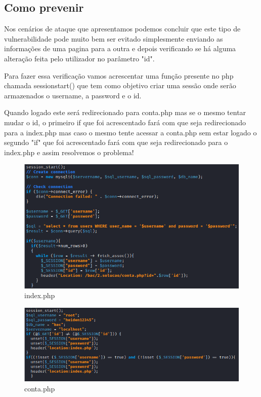 \documentclass{report}
\begin{document}
\clearpage

\subsection{Como prevenir}
Nos cenários de ataque que apresentamos podemos concluir que este tipo de vulnerabilidade pode muito bem ser evitado simplesmente enviando as informações de uma pagina para a outra e depois verificando se há alguma alteração feita pelo utilizador no parâmetro "id". 

Para fazer essa verificação vamos acrescentar uma função presente no php chamada session\textunderscore start() que tem como objetivo criar uma sessão onde serão armazenados o username, a password e o id. 

Quando logado este será redirecionado para conta.php mas se o mesmo tentar mudar o id, o primeiro if que foi acrescentado fará com que seja redirecionado para a index.php mas caso o mesmo tente acessar a conta.php sem estar logado o segundo "if" que foi acrescentado fará com que seja redirecionado para o index.php e assim resolvemos o problema!

\begin{figure}[!htb]
\centering
{}
  \includegraphics[width=\linewidth]{imagescodebac/baccode3.png}
  \caption{index.php}\label{fig:index.php}
\endminipage
\end{figure}
\begin{figure}[!htb]
\centering
{}
  \includegraphics[width=\linewidth]{imagescodebac/baccode4.png}
  \caption{conta.php}\label{fig:conta.php}
\endminipage
\end{figure}
\end{document}
